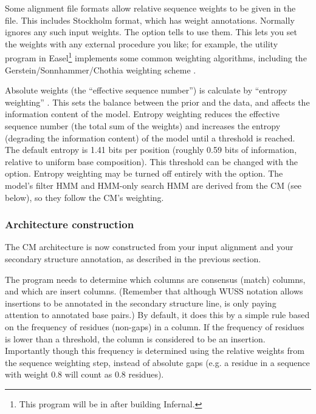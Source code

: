 Some alignment file formats allow relative sequence weights to be
given in the file. This includes Stockholm format, which has
 weight annotations. Normally  ignores any
such input weights.  The  option tells 
to use them.  This lets you set the weights with any external
procedure you like; for example, the  utility program in
Easel\footnote{This program will be in
   after building Infernal.} 
implements some common weighting algorithms,
including the Gerstein/Sonnhammer/Chothia weighting scheme
\citep{Gerstein94}.

Absolute weights (the ``effective sequence number'') is calculate by
``entropy weighting'' \citep{Karplus98}. This sets the balance between
the prior and the data, and affects the information content of the
model. Entropy weighting reduces the effective sequence number (the
total sum of the weights) and increases the entropy (degrading the
information content) of the model until a threshold is reached. The
default entropy is 1.41 bits per position (roughly 0.59 bits of
information, relative to uniform base composition). This threshold can
be changed with the  option. Entropy weighting may
be turned off entirely with the  option.
The model's filter HMM and HMM-only search HMM are derived from the CM
(see below), so they follow the CM's weighting.


\subsubsection{Architecture construction}

The CM architecture is now constructed from your input alignment and
your secondary structure annotation, as described in the previous
section. 

The program needs to determine which columns are consensus (match)
columns, and which are insert columns. (Remember that although WUSS
notation allows insertions to be annotated in the secondary structure
line,  is only paying attention to annotated base
pairs.) By default, it does this by a simple rule based on the
frequency of residues (non-gaps) in a column. If the frequency of
residues is lower than a threshold, the column is considered to be
an insertion. Importantly though this frequency is determined using
the relative weights from the sequence weighting step, instead of
absolute gaps (e.g. a residue in a sequence with weight $0.8$ will count
 as $0.8$ residues).

